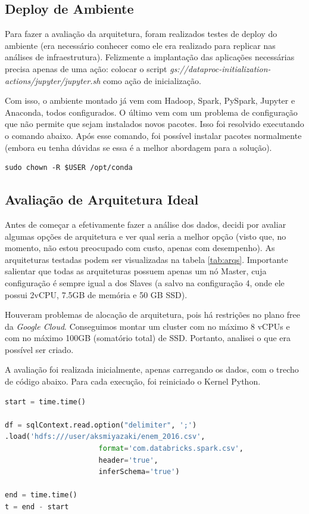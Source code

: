 \documentclass{article}
\begin{document}
\subsection{Deploy de Ambiente}

Para fazer a avaliação da arquitetura, foram realizados testes de deploy do ambiente (era necessário conhecer como ele era realizado para replicar nas análises de infraestrutura). Felizmente a implantação das aplicações necessárias precisa apenas de uma ação: colocar o script \emph{gs://dataproc-initialization-actions/jupyter/jupyter.sh} como ação de inicialização.

Com isso, o ambiente montado já vem com Hadoop, Spark, PySpark, Jupyter e Anaconda, todos configurados. O último vem com um problema de configuração que não permite que sejam instalados novos pacotes. Isso foi resolvido executando o comando abaixo. Após esse comando, foi possível instalar pacotes normalmente (embora eu tenha dúvidas se essa é a melhor abordagem para a solução).

\begin{lstlisting}[caption= {Solução de problema de Permissão.},captionpos=b]
sudo chown -R $USER /opt/conda
\end{lstlisting}

\subsection{Avaliação de Arquitetura Ideal}

Antes de começar a efetivamente fazer a análise dos dados, decidi por avaliar algumas opções de arquitetura e ver qual seria a melhor opção (visto que, no momento, não estou preocupado com custo, apenas com desempenho). As arquiteturas testadas podem ser visualizadas na tabela \ref{tab:arqs}. Importante salientar que todas as arquiteturas possuem apenas um nó Master, cuja configuração é sempre igual a dos Slaves (a salvo na configuração 4, onde ele possui 2vCPU, 7.5GB de memória e 50 GB SSD).

Houveram problemas de alocação de arquitetura, pois há restrições no plano free da \emph{Google Cloud}. Conseguimos montar um cluster com no máximo 8 vCPUs e com no máximo 100GB (somatório total) de SSD. Portanto, analisei o que era possível ser criado.

A avaliação foi realizada inicialmente, apenas carregando os dados, com o trecho de código abaixo. Para cada execução, foi reiniciado o Kernel Python.

\begin{lstlisting}[caption= {Carga de dados no Spark},captionpos=b, language=python]
start = time.time()

df = sqlContext.read.option("delimiter", ';')
.load('hdfs:///user/aksmiyazaki/enem_2016.csv', 
                      format='com.databricks.spark.csv', 
                      header='true', 
                      inferSchema='true')

end = time.time()
t = end - start
\end{lstlisting}
\end{document}

